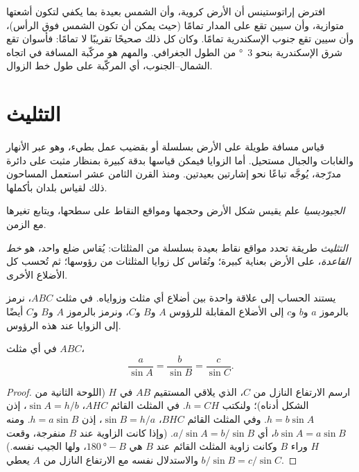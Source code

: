 \begin{remark}[ما افتُرض]\label{rem:g10:measuring-the-earth:assumptions}
افترض إراتوستينس أن الأرض كروية، وأن الشمس بعيدة بما يكفي لتكون أشعتها
متوازية، وأن سيين تقع على المدار تمامًا (حيث يمكن أن تكون الشمس فوق الرأس)، وأن
سيين تقع جنوب الإسكندرية تمامًا. وكان كل ذلك صحيحًا تقريبًا لا تمامًا: فأسوان
تقع شرق الإسكندرية بنحو \qty{3}{\degree} من الطول الجغرافي. والمهم هو مركّبة
المسافة في اتجاه الشمال--الجنوب، أي المركّبة على طول خط الزوال.
\end{remark}

\section{التثليث}

قياس مسافة طويلة على الأرض بسلسلة أو بقضيب عمل بطيء، وهو عبر الأنهار والغابات
والجبال مستحيل. أما الزوايا فيمكن قياسها بدقة كبيرة بمنظار مثبت على دائرة
مدرّجة، يُوجَّه تباعًا نحو إشارتين بعيدتين. ومنذ القرن الثامن عشر استعمل
المساحون ذلك لقياس بلدان بأكملها.

\begin{definition}[الجيوديسيا]\label{def:g10:measuring-the-earth:geodesy}
\emph{الجيوديسيا} علم يقيس شكل الأرض وحجمها ومواقع النقاط
على سطحها، ويتابع تغيرها مع الزمن.
\end{definition}

\begin{definition}[التثليث]\label{def:g10:measuring-the-earth:triangulation}
\emph{التثليث} طريقة تحدد مواقع نقاط بعيدة بسلسلة من المثلثات:
يُقاس ضلع واحد، هو \emph{خط القاعدة}، على الأرض بعناية كبيرة؛ وتُقاس كل زوايا
المثلثات من رؤوسها؛ ثم تُحسب كل الأضلاع
الأخرى.
\end{definition}

يستند الحساب إلى علاقة واحدة بين أضلاع أي مثلث وزواياه. في مثلث $ABC$، نرمز
بالرموز $a$ و$b$ و$c$ إلى الأضلاع المقابلة للرؤوس $A$ و$B$ و$C$، ونرمز
بالرموز $A$ و$B$ و$C$ أيضًا إلى الزوايا عند هذه الرؤوس.

\begin{proposition}\label{prop:g10:measuring-the-earth:sine-rule}
في أي مثلث $ABC$،
\[
  \frac{a}{\sin A} = \frac{b}{\sin B} = \frac{c}{\sin C}.
\]
\end{proposition}

\begin{proof}
ارسم الارتفاع النازل من $C$، الذي يلاقي المستقيم $AB$ في $H$ (اللوحة الثانية
من الشكل أدناه)؛ ولنكتب $h = CH$. في المثلث القائم $AHC$، $\sin A = h/b$،
إذن $h = b \sin A$. وفي المثلث القائم $BHC$، $\sin B = h/a$، إذن
$h = a \sin B$. ومنه $b \sin A = a \sin B$، أي $a/\sin A = b/\sin B$.
(وإذا كانت الزاوية عند $B$ منفرجة، وقعت $H$ وراء $B$ وكانت زاوية المثلث
القائم عند $B$ هي $\qty{180}{\degree} - B$، ولها الجيب نفسه.) والاستدلال نفسه
مع الارتفاع النازل من $A$ يعطي $b/\sin B = c/\sin C$.
\end{proof}

